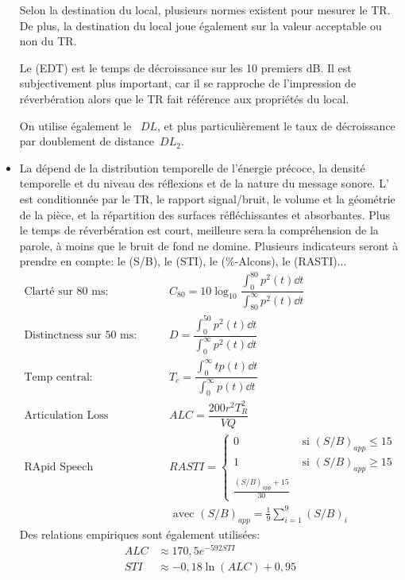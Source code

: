 \begin{itemize}
Selon la destination du local, plusieurs normes existent pour mesurer le TR. De plus, la destination du local joue également sur la valeur acceptable ou non du TR.

Le  (EDT) est le temps de décroissance sur les 10 premiers dB. Il est subjectivement plus important, car il se rapproche de l'impression de réverbération alors que le TR fait référence aux propriétés du local.

   On utilise également le ~$DL$, et plus particulièrement le taux de décroissance par doublement de distance~$DL_2$.

   \item La  dépend de la distribution temporelle de l'énergie précoce, la densité temporelle et du niveau des réflexions et de la nature du message sonore. 
   L' est conditionnée par le TR, le rapport signal/bruit, le volume et la géométrie de la pièce, et la répartition des surfaces réfléchissantes et absorbantes.
   Plus le temps de réverbération est court, meilleure sera la compréhension de la parole, à moins que le bruit de fond ne domine.
   Plusieurs indicateurs seront à prendre en compte: le  (S/B), le (STI), le  (\%-Alcons), le  (RASTI)...
   \begin{align*}
   \text{Clarté sur 80~ms: } & C_{80}=10\log_{10}\dfrac{\int_0^{80}p^2(t)\dd t}{\int_{80}^\infty p^2(t)\dd t}\\
   \text{Distinctness sur 50~ms: } & D = \dfrac{\int_0^{50}p^2(t)\dd t}{\int_{0}^\infty p^2(t)\dd t}\\
   \text{Temp central: } & T_c = \dfrac{\int_0^\infty tp(t)\dd t}{\int_0^\infty p(t)\dd t}\\
   \text{Articulation Loss Consonent: } & ALC=\dfrac{200 r^2T_R^2}{VQ}\\
   \text{RApid Speech Transmission Index: } & RASTI =
   \left\{\begin{array}{ll}
   0 & \text{ si } (S/B)_{app}\le 15\\
   1 & \text{ si } (S/B)_{app}\ge 15\\
   \frac{(S/B)_{app}+15}{30}
   \end{array}
   \right.\\
   & \text{ avec } (S/B)_{app}=\frac19\sum_{i=1}^9 (S/B)_i
   \end{align*}
   Des relations empiriques sont également utilisées:
   \begin{align*}
    ALC &\approx 170,5 e^{-592 STI} \\
    STI &\approx -0,18 \ln(ALC) + 0,95
   \end{align*}


\end{itemize}
